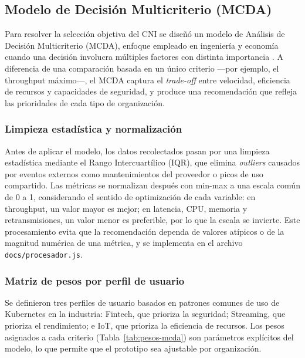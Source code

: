 \subsection{Modelo de Decisión Multicriterio (MCDA)}

Para resolver la selección objetiva del CNI se diseñó un modelo de Análisis de Decisión Multicriterio (MCDA), enfoque empleado en ingeniería y economía cuando una decisión involucra múltiples factores con distinta importancia \cite{ref9}. A diferencia de una comparación basada en un único criterio ---por ejemplo, el throughput máximo---, el MCDA captura el \emph{trade-off} entre velocidad, eficiencia de recursos y capacidades de seguridad, y produce una recomendación que refleja las prioridades de cada tipo de organización.

\subsubsection{Limpieza estadística y normalización}

Antes de aplicar el modelo, los datos recolectados pasan por una limpieza estadística mediante el Rango Intercuartílico (IQR), que elimina \emph{outliers} causados por eventos externos como mantenimientos del proveedor o picos de uso compartido. Las métricas se normalizan después con min-max a una escala común de 0 a 1, considerando el sentido de optimización de cada variable: en throughput, un valor mayor es mejor; en latencia, CPU, memoria y retransmisiones, un valor menor es preferible, por lo que la escala se invierte. Este procesamiento evita que la recomendación dependa de valores atípicos o de la magnitud numérica de una métrica, y se implementa en el archivo \texttt{docs/procesador.js}.

\subsubsection{Matriz de pesos por perfil de usuario}

Se definieron tres perfiles de usuario basados en patrones comunes de uso de Kubernetes en la industria: Fintech, que prioriza la seguridad; Streaming, que prioriza el rendimiento; e IoT, que prioriza la eficiencia de recursos. Los pesos asignados a cada criterio (Tabla~\ref{tab:pesos-mcda}) son parámetros explícitos del modelo, lo que permite que el prototipo sea ajustable por organización.

